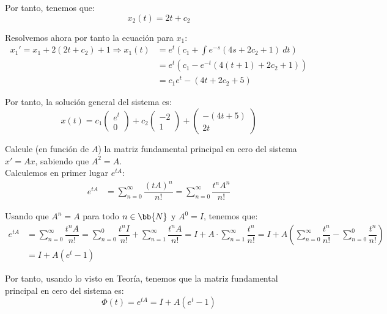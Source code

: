 \documentclass[12pt]{article}
\begin{document}
\begin{ejercicio}
        Por tanto, tenemos que:
        \begin{equation*}
            x_2(t)=2t+c_2
        \end{equation*}

        Resolvemos ahora por tanto la ecuación para $x_1$:
        \begin{align*}
            x_1'=x_1+2(2t+c_2)+1
            \Longrightarrow x_1(t)&=e^t\left(c_1+\int e^{-s}\left(4s+2c_2+1\right)\ dt\right)\\
            &= e^t\left(c_1-e^{-t}(4(t+1)+2c_2+1)\right)\\
            &= c_1e^t -(4t+2c_2+5)
        \end{align*}

        Por tanto, la solución general del sistema es:
        \begin{equation*}
            x(t)=c_1\begin{pmatrix}
                e^t\\
                0
            \end{pmatrix}+c_2\begin{pmatrix}
                -2\\
                1
            \end{pmatrix}+\begin{pmatrix}
                -(4t+5)\\
                2t
            \end{pmatrix}
        \end{equation*}
    \end{ejercicio}

    \begin{ejercicio}
    Calcule (en función de $A$) la matriz fundamental principal en cero del sistema $x'=Ax$, sabiendo que $A^2=A$.\\

    Calculemos en primer lugar $e^{tA}$:
    \begin{align*}
        e^{tA}&=\sum_{n=0}^\infty \dfrac{(tA)^n}{n!}
        =\sum_{n=0}^\infty \dfrac{t^nA^n}{n!}
    \end{align*}

    Usando que $A^n=A$ para todo $n\in\bb{N}$ y $A^0=I$, tenemos que:
    \begin{align*}
        e^{tA}&=\sum_{n=0}^\infty \dfrac{t^nA}{n!}
        =\sum_{n=0}^0 \dfrac{t^nI}{n!}+\sum_{n=1}^\infty \dfrac{t^nA}{n!}
        =I+A\cdot \sum_{n=1}^\infty \dfrac{t^n}{n!}
        =I+A\left(\sum_{n=0}^\infty \dfrac{t^n}{n!}-\sum_{n=0}^0 \dfrac{t^n}{n!}\right)\\
        &=I+A(e^t-1)
    \end{align*}

    Por tanto, usando lo visto en Teoría, tenemos que la matriz fundamental principal en cero del sistema es:
    \begin{equation*}
        \Phi(t)=e^{tA}=I+A(e^t-1)
    \end{equation*}
    \end{ejercicio}
\end{document}
